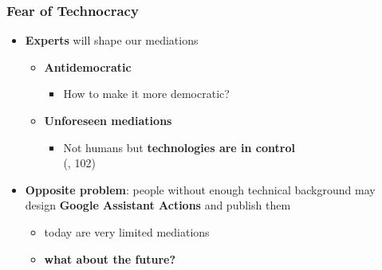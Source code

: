 \documentclass{beamer}
\begin{document}
\begin{frame}
	\frametitle{Fear of Technocracy}

	\begin{itemize}
		\item \textbf{Experts} will shape our mediations
		\smallskip
		\begin{itemize}
			\item \textbf{Antidemocratic}
			\begin{itemize}
				\item How to make it more democratic?
			\end{itemize}
			\smallskip
			\item \textbf{Unforeseen mediations}
			\begin{itemize}
				\item Not humans but \textbf{technologies are in control}\\(\cite{verbeek2011moralizing}, 102)
			\end{itemize}
		\end{itemize}
	     \bigskip
		\item \textbf{Opposite problem}: people without enough technical background may design \textbf{Google Assistant Actions} and publish them
		\smallskip
		\begin{itemize}
			\item today are very limited mediations
			\smallskip
			\item \textbf{what about the future?}
		\end{itemize}
	\end{itemize}
\end{frame}
\end{document}
